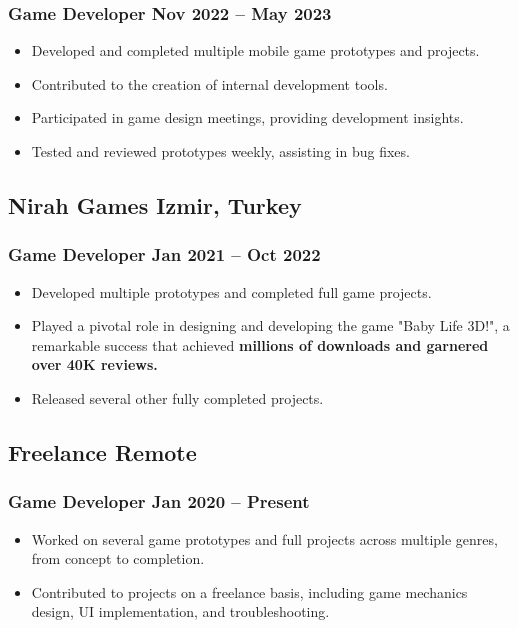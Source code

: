\documentclass[11pt]{article}
\newcommand{\rside}[1]{
  \hfill {\normalfont\color{accent} #1}%
}
\begin{document}
\subsubsection{Game Developer \rside{Nov 2022 -- May 2023}}
\begin{itemize}
  \item Developed and completed multiple mobile game prototypes and projects.
  \item Contributed to the creation of internal development tools.
  \item Participated in game design meetings, providing development insights.
  \item Tested and reviewed prototypes weekly, assisting in bug fixes.
\end{itemize}

\subsection{Nirah Games  \rside{Izmir, Turkey}}
\subsubsection{Game Developer \rside{Jan 2021 -- Oct 2022}}
\begin{itemize}
  \item Developed multiple prototypes and completed full game projects.
  \item Played a pivotal role in designing and developing the game "Baby Life 3D!", a remarkable success that achieved \textbf{millions of downloads and garnered over 40K reviews.}
  \item Released several other fully completed projects.
\end{itemize}

\subsection{Freelance \rside{Remote}}
\subsubsection{Game Developer \rside{Jan 2020 -- Present}}
\begin{itemize}
  \item Worked on several game prototypes and full projects across multiple genres, from concept to completion.
  \item Contributed to projects on a freelance basis, including game mechanics design, UI implementation, and troubleshooting.
\end{itemize}
\end{document}
